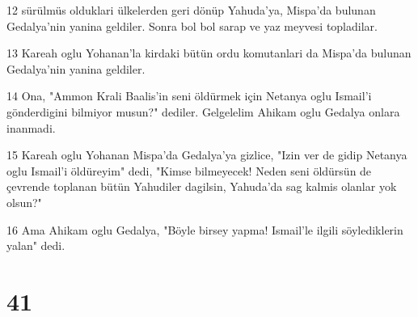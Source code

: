 \par 12 sürülmüs olduklari ülkelerden geri dönüp Yahuda'ya, Mispa'da bulunan Gedalya'nin yanina geldiler. Sonra bol bol sarap ve yaz meyvesi topladilar.
\par 13 Kareah oglu Yohanan'la kirdaki bütün ordu komutanlari da Mispa'da bulunan Gedalya'nin yanina geldiler.
\par 14 Ona, "Ammon Krali Baalis'in seni öldürmek için Netanya oglu Ismail'i gönderdigini bilmiyor musun?" dediler. Gelgelelim Ahikam oglu Gedalya onlara inanmadi.
\par 15 Kareah oglu Yohanan Mispa'da Gedalya'ya gizlice, "Izin ver de gidip Netanya oglu Ismail'i öldüreyim" dedi, "Kimse bilmeyecek! Neden seni öldürsün de çevrende toplanan bütün Yahudiler dagilsin, Yahuda'da sag kalmis olanlar yok olsun?"
\par 16 Ama Ahikam oglu Gedalya, "Böyle birsey yapma! Ismail'le ilgili söylediklerin yalan" dedi.

\chapter{41}

